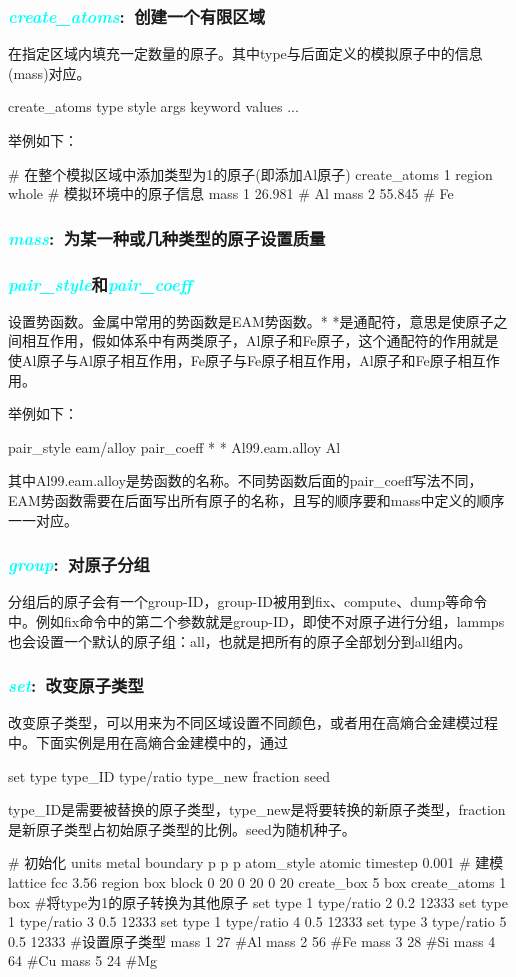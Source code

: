 \frame
{
	\frametitle{\textcolor{cyan}{\textit{create\_atoms}}:~创建一个有限区域}
	在指定区域内填充一定数量的原子。其中type与后面定义的模拟原子中的信息(mass)对应。

create_atoms type style args keyword values ...

举例如下：

# 在整个模拟区域中添加类型为1的原子(即添加Al原子)
create_atoms 1 region whole
# 模拟环境中的原子信息
mass 1 26.981   # Al
mass 2 55.845   # Fe
}

\frame
{
	\frametitle{\textcolor{cyan}{\textit{mass}}:~为某一种或几种类型的原子设置质量}
}

\frame
{
	\frametitle{\textcolor{cyan}{\textit{pair\_style}}和\textcolor{cyan}{\textit{pair\_coeff}}}
	设置势函数。金属中常用的势函数是EAM势函数。* *是通配符，意思是使原子之间相互作用，假如体系中有两类原子，Al原子和Fe原子，这个通配符的作用就是使Al原子与Al原子相互作用，Fe原子与Fe原子相互作用，Al原子和Fe原子相互作用。

举例如下：

pair_style	eam/alloy
pair_coeff	* * Al99.eam.alloy Al

其中Al99.eam.alloy是势函数的名称。不同势函数后面的pair_coeff写法不同，EAM势函数需要在后面写出所有原子的名称，且写的顺序要和mass中定义的顺序一一对应。
}

\frame
{
	\frametitle{\textcolor{cyan}{\textit{group}}:~对原子分组}
	分组后的原子会有一个group-ID，group-ID被用到fix、compute、dump等命令中。例如fix命令中的第二个参数就是group-ID，即使不对原子进行分组，lammps也会设置一个默认的原子组：all，也就是把所有的原子全部划分到all组内。
}

\frame
{
	\frametitle{\textcolor{cyan}{\textit{set}}:~改变原子类型}
	改变原子类型，可以用来为不同区域设置不同颜色，或者用在高熵合金建模过程中。下面实例是用在高熵合金建模中的，通过

set type type_ID type/ratio type_new fraction seed

type_ID是需要被替换的原子类型，type_new是将要转换的新原子类型，fraction是新原子类型占初始原子类型的比例。seed为随机种子。

# 初始化
units         metal
boundary      p p p
atom_style    atomic
timestep      0.001
# 建模
lattice       fcc 3.56
region        box block 0 20 0 20 0 20
create_box    5 box
create_atoms    1 box
#将type为1的原子转换为其他原子
set    type 1 type/ratio 2 0.2 12333
set    type 1 type/ratio 3 0.5 12333
set    type 1 type/ratio 4 0.5 12333
set    type 3 type/ratio 5 0.5 12333
#设置原子类型
mass    1 27 #Al
mass    2 56 #Fe
mass    3 28 #Si
mass    4 64 #Cu
mass    5 24 #Mg
}

